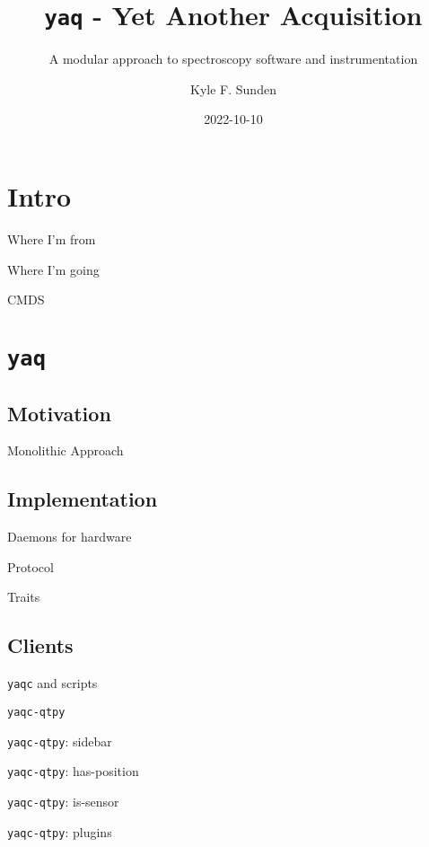 \documentclass{presentation}
\title{\texttt{yaq} - Yet Another Acquisition}
\subtitle{A modular approach to spectroscopy software and instrumentation}
\author{Kyle F. Sunden}
\institute{University of Wisconsin--Madison}
\date{2022-10-10}
\begin{document}
\maketitle
\section{Intro}
\begin{frame}{Where I'm from}
\end{frame}
\begin{frame}{Where I'm going}
\end{frame}
\begin{frame}{CMDS}
\end{frame}
\section{\texttt{yaq}}
\subsection{Motivation}
\begin{frame}{Monolithic Approach}
\end{frame}
\subsection{Implementation}
\begin{frame}{Daemons for hardware}
\end{frame}
\begin{frame}{Protocol}
\end{frame}
\begin{frame}{Traits}
\end{frame}
\subsection{Clients}
\begin{frame}{\texttt{yaqc} and scripts}
\end{frame}
\begin{frame}{\texttt{yaqc-qtpy}}
\end{frame}
\begin{frame}{\texttt{yaqc-qtpy}: sidebar}
\end{frame}
\begin{frame}{\texttt{yaqc-qtpy}: has-position}
\end{frame}
\begin{frame}{\texttt{yaqc-qtpy}: is-sensor}
\end{frame}
\begin{frame}{\texttt{yaqc-qtpy}: plugins}
\end{frame}
\end{document}

